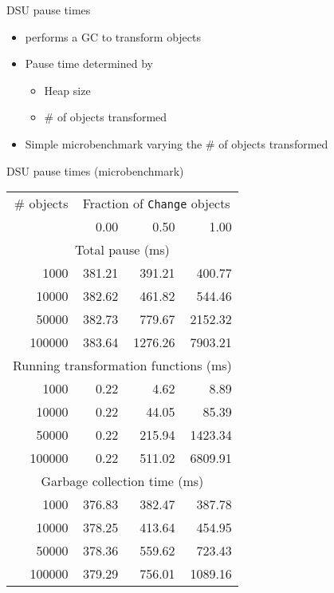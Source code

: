 \begin{frame}{DSU pause times}%
\begin{itemize}
\item \DSU{} performs a GC to transform objects
\item Pause time determined by
  \begin{itemize}
  \item Heap size
  \item \# of objects transformed
  \end{itemize}
\item Simple microbenchmark varying the \# of objects transformed
\end{itemize}
\end{frame}

\begin{frame}[shrink=5]{DSU pause times (microbenchmark)}%
\begin{footnotesize}
\begin{center}
\begin{tabular}{|r|rrr|} \hline
\# objects & \multicolumn{3}{c|}{Fraction of \texttt{Change} objects} \\
          &   0.00 &   0.50&   1.00 \\ \hline

    \multicolumn{4}{|c|}{Total pause (ms)} \\ \hline
      1000& 381.21 & 391.21& 400.77 \\
     10000& 382.62 & 461.82& 544.46 \\
     50000& 382.73 & 779.67&2152.32 \\
    100000& 383.64 &1276.26&7903.21 \\ \hline

    \multicolumn{4}{|c|}{Running transformation functions (ms)} \\ \hline
      1000&   0.22 &   4.62&   8.89 \\
     10000&   0.22 &  44.05&  85.39 \\
     50000&   0.22 & 215.94&1423.34 \\
    100000&   0.22 & 511.02&6809.91 \\ \hline

    \multicolumn{4}{|c|}{Garbage collection time (ms)} \\ \hline
      1000& 376.83 & 382.47& 387.78 \\
     10000& 378.25 & 413.64& 454.95 \\
     50000& 378.36 & 559.62& 723.43 \\
    100000& 379.29 & 756.01&1089.16 \\ \hline
\end{tabular}
\end{center}
\end{footnotesize}
\end{frame}
